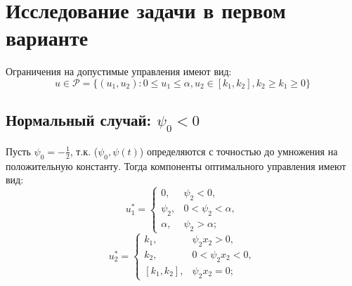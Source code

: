 \documentclass[11pt]{article}
\begin{document}
{	 
	 \section{Исследование задачи в первом варианте}
	 {Ограничения на допустимые управления имеют вид:}
	 \[ u \in \mathcal{P} = \{(u_1,u_2): 0 \leq u_1 \leq \alpha, u_2 \in[k_1,k_2],k_2 \geq k_1 \geq 0 \} \]
	 
	 \subsection{Нормальный случай: $\psi_0 < 0$}
	 {Пусть $\psi_0 = -\frac{1}{2}$, т.к. ($\psi_0,\psi(t)$) определяются с точностью до умножения на положительную константу. Тогда компоненты оптимального управления имеют вид:}
	 \begin{equation}
	 u_1^* = \begin{cases}
	 0, & \psi_2 < 0, \\
	 \psi_2, & 0 < \psi_2 < \alpha,\\
	 \alpha, & \psi_2 > \alpha;
	 \end{cases}
	 \end{equation}
	 \begin{equation}
	 u_2^* = \begin{cases}
	 k_1, & \psi_2x_2 > 0, \\
	 k_2, & 0 < \psi_2x_2 < 0,\\
	 [k_1,k_2], & \psi_2x_2 = 0;
	 \end{cases}
	 \end{equation}
	 
}
\end{document}

